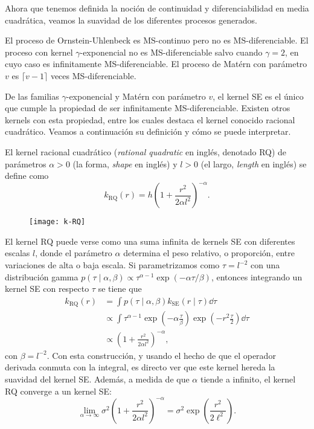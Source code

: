 Ahora que tenemos definida la noción de continuidad y diferenciabilidad en media cuadrática, veamos la suavidad de los diferentes procesos generados.
\begin{proposition}
	El proceso de Ornstein-Uhlenbeck es MS-continuo pero no es MS-dife\-ren\-ciable. El proceso con kernel \(\gamma\)-exponencial no es MS-diferenciable salvo cuando \(\gamma = 2\), en cuyo caso es infinitamente MS-diferenciable. El proceso de Matérn con parámetro \(v\) es \(\lceil v-1 \rceil\) veces MS-diferenciable.
\end{proposition}

De las familias \(\gamma\)-exponencial y Matérn con parámetro \(v\), el kernel SE es el único que cumple la propiedad de ser infinitamente MS-diferenciable. Existen otros kernels con esta propiedad, entre los cuales destaca el kernel conocido racional cuadrático. Veamos a continuación su definición y cómo se puede interpretar.

\begin{definition}
	El kernel racional cuadrático (\emph{rational quadratic} en inglés, denotado RQ) de parámetros \(\alpha > 0\) (la forma, \emph{shape} en inglés) y \(l > 0\) (el largo, \emph{length} en inglés) se define como
	\[ k_{\mathrm{RQ}}(r) = h \left(1 + \frac{r^2}{2\alpha l^2}\right)^{-\alpha}.\]
\end{definition}

\begin{figure}[h]
	\centering
	\texttt{[image: k-RQ]}
\end{figure}

El kernel RQ puede verse como una suma infinita de kernels SE con diferentes escalas \(l\), donde el parámetro \(\alpha\) determina el peso relativo, o proporción, entre variaciones de alta o baja escala. Si parametrizamos como \(\tau = l^{-2}\) con una distribución gamma \(p (\tau \mid \alpha, \beta) \propto \tau^{\alpha - 1} \exp (-\alpha \tau / \beta )\), entonces integrando un kernel SE con respecto \(\tau\) se tiene que
\begin{align*}
	k_{\mathrm{RQ}}(r)	&= \int p(\tau \mid \alpha, \beta) k_{\mathrm{SE}}(r \mid \tau) \dd{\tau} \\
						&\propto \int \tau^{\alpha-1} \exp \left(-\alpha \frac{\tau}{\beta} \right) \exp \left(-r^{2} \frac{\tau}{2}\right) \dd{\tau} \\
						&\propto \left(1 + \frac{r^{2}}{2\alpha l^{2}}\right)^{-\alpha},
\end{align*}
con \(\beta = l^{-2}\). Con esta construcción, y usando el hecho de que el operador derivada conmuta con la integral, es directo ver que este kernel hereda la suavidad del kernel SE. Además, a medida de que \(\alpha\) tiende a infinito, el kernel RQ converge a un kernel SE:
\begin{equation*}
	\lim_{\alpha \to \infty} \sigma^2 \left(1 + \frac{r^{2}}{2\alpha l^{2}}\right)^{-\alpha} = \sigma^2 \exp\left(\frac{r^{2}}{2 \ell^{2}}\right).
\end{equation*}

